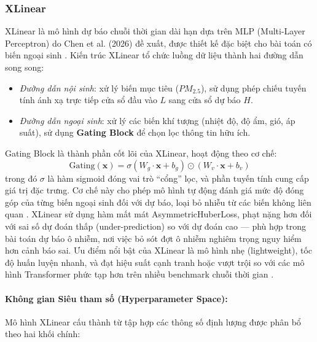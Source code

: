 \subsubsection{XLinear}
XLinear là mô hình dự báo chuỗi thời gian dài hạn dựa trên MLP (Multi-Layer Perceptron) do Chen et al. (2026) đề xuất, được thiết kế đặc biệt cho bài toán có biến ngoại sinh \cite{Chen_2026}. Kiến trúc XLinear tổ chức luồng dữ liệu thành hai đường dẫn song song:
\begin{itemize}
    \item \textit{Đường dẫn nội sinh}: xử lý biến mục tiêu ($PM_{2.5}$), sử dụng phép chiếu tuyến tính ánh xạ trực tiếp cửa sổ đầu vào $L$ sang cửa sổ dự báo $H$.
    \item \textit{Đường dẫn ngoại sinh}: xử lý các biến khí tượng (nhiệt độ, độ ẩm, gió, áp suất), sử dụng \textbf{Gating Block} để chọn lọc thông tin hữu ích.
\end{itemize}
Gating Block là thành phần cốt lõi của XLinear, hoạt động theo cơ chế:
\begin{equation}
    \text{Gating}(\mathbf{x}) = \sigma(W_g \cdot \mathbf{x} + b_g) \odot (W_v \cdot \mathbf{x} + b_v)
\end{equation}
trong đó $\sigma$ là hàm sigmoid đóng vai trò ``cổng'' lọc, và phần tuyến tính cung cấp giá trị đặc trưng. Cơ chế này cho phép mô hình tự động đánh giá mức độ đóng góp của từng biến ngoại sinh đối với dự báo, loại bỏ nhiễu từ các biến không liên quan \cite{Chen_2026}. XLinear sử dụng hàm mất mát AsymmetricHuberLoss, phạt nặng hơn đối với sai số dự đoán thấp (under-prediction) so với dự đoán cao — phù hợp trong bài toán dự báo ô nhiễm, nơi việc bỏ sót đợt ô nhiễm nghiêm trọng nguy hiểm hơn cảnh báo sai. Ưu điểm nổi bật của XLinear là mô hình nhẹ (lightweight), tốc độ huấn luyện nhanh, và đạt hiệu suất cạnh tranh hoặc vượt trội so với các mô hình Transformer phức tạp hơn trên nhiều benchmark chuỗi thời gian \cite{Chen_2026}.

\paragraph{Không gian Siêu tham số (Hyperparameter Space):}
Mô hình XLinear cấu thành từ tập hợp các thông số định lượng được phân bổ theo hai khối chính:


